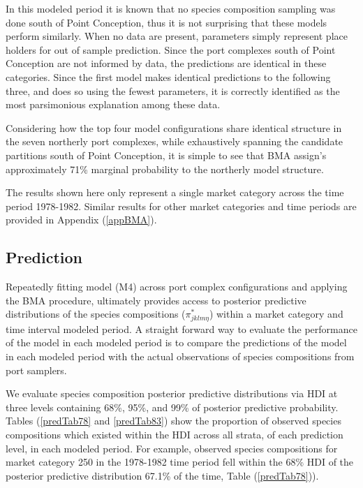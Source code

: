 \documentclass[12pt]{article}
\begin{document}
In this modeled period it is known that no species composition sampling
was done south of Point Conception, thus it is not surprising that these
models perform similarly. When no data are present, parameters simply
represent place holders for out of sample prediction. Since the port
complexes south of Point Conception are not informed by data, the
predictions are identical in these categories. Since the first model
makes identical predictions to the following three, and does so using
the fewest parameters, it is correctly identified as the most
parsimonious explanation among these data.

Considering how the top four model configurations share identical
structure in the seven northerly port complexes, while exhaustively
spanning the candidate partitions south of Point Conception, it is
simple to see that BMA assign's approximately 71\% marginal probability
to the northerly model structure.

The results shown here only represent a single market category across
the time period 1978-1982. Similar results for other market categories
and time periods are provided in Appendix (\ref{appBMA}).

\subsection{Prediction}\label{prediction}

Repeatedly fitting model (M4) across port complex configurations and
applying the BMA procedure, ultimately provides access to posterior
predictive distributions of the species compositions
(\(\pi^*_{jklm\eta}\)) within a market category and time interval
modeled period. A straight forward way to evaluate the performance of
the model in each modeled period is to compare the predictions of the
model in each modeled period with the actual observations of species
compositions from port samplers.

We evaluate species composition posterior predictive distributions via
HDI at three levels containing 68\%, 95\%, and 99\% of posterior
predictive probability. Tables (\ref{predTab78} and \ref{predTab83}) 
show the proportion of observed species compositions which existed within the 
HDI across all strata, of each prediction level, in each modeled period. For 
example, observed species compositions for market category 250 in the 
1978-1982 time period fell within the 68\% HDI of the posterior 
predictive distribution 67.1\% of the time, Table (\ref{predTab78})).
\end{document}
